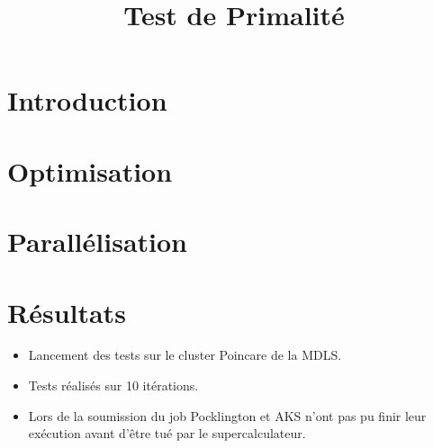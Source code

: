 
\usepackage{../tex/myInfolines}
\usepackage{graphicx}
\usepackage{algorithm}
\usepackage{algorithmic}
\usepackage{subcaption}
\usepackage{longtable,array}
\newenvironment{figure*}%
{\begin{figure}}
{\end{figure}}
\title{Test de Primalité}


	\begin{frame}
		\titlepage
	\end{frame}
	
	\section*{Introduction}
        \begin{frame}
                    
        \end{frame}
	
	\begin{frame}
		\tableofcontents
	\end{frame}
	
	\section{Optimisation}
	\begin{frame}
	
	\end{frame}
	
	\section{Parallélisation}
	\begin{frame}
	
	\end{frame}
	
	\section{Résultats}
	\begin{frame}
		\begin{itemize}
		\item Lancement des tests sur le cluster Poincare de la MDLS. \vspace{2em}
		\item Tests réalisés sur 10 itérations.\vspace{2em}
		\item Lors de la soumission du job Pocklington et AKS n'ont pas pu finir leur exécution avant d'être tué par le supercalculateur.\\
		\end{itemize}
	\end{frame}		
	
